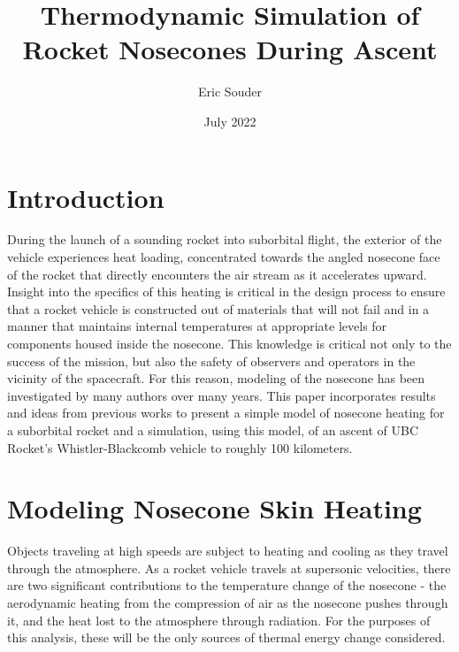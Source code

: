 \documentclass[twocolumn]{article}
\title{Thermodynamic Simulation of Rocket Nosecones During Ascent}
\author{Eric Souder}
\date{July 2022}
\begin{document}
    \section{Introduction}
        During the launch of a sounding rocket into suborbital flight, the 
        exterior of the vehicle experiences heat loading, concentrated
        towards the angled nosecone face of the rocket that directly encounters
        the air stream as it accelerates upward. Insight into the 
        specifics of this heating is critical in the design process to ensure 
        that a rocket vehicle is constructed out of materials that will not fail
        and in a manner that maintains internal temperatures at appropriate levels for 
        components housed inside the nosecone. This knowledge is critical not 
        only to the success of the mission, but also the safety of observers and 
        operators in the vicinity of the spacecraft. For this reason, modeling of the
        nosecone has been investigated by many authors over many years.
        This paper incorporates results and ideas from previous works to present
        a simple model of nosecone heating for a suborbital rocket and a simulation, 
        using this model, of an ascent of UBC Rocket's Whistler-Blackcomb vehicle 
        to roughly 100 kilometers.

    \section{Modeling Nosecone Skin Heating}
        Objects traveling at high speeds are subject to heating and cooling as 
        they travel through the atmosphere. As a rocket vehicle travels at 
        supersonic velocities, there are two significant contributions to 
        the temperature change of the nosecone - the aerodynamic heating from 
        the compression of air as the nosecone pushes through it, and the heat
        lost to the atmosphere through radiation. For the purposes of this 
        analysis, these will be the only sources of thermal energy change
        considered.
\end{document}
